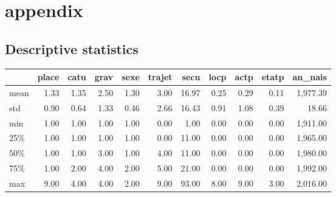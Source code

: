 \documentclass[a4paper]{article}
\theoremstyle{definition}
\theoremstyle{proposition}
\begin{document}
\section{appendix}

\subsection{Descriptive statistics} \label{Descriptive statistics}
\begin{tabular}{lrrrrrrrrrr}
\toprule
{} &      place &       catu &       grav &       sexe &     trajet &       secu &       locp &       actp &      etatp &    an\_nais \\
\midrule
mean  &       1.33 &       1.35 &       2.50 &       1.30 &       3.00 &      16.97 &       0.25 &       0.29 &       0.11 &   1,977.39 \\
std   &       0.90 &       0.64 &       1.33 &       0.46 &       2.66 &      16.43 &       0.91 &       1.08 &       0.39 &      18.66 \\
min   &       1.00 &       1.00 &       1.00 &       1.00 &       0.00 &       1.00 &       0.00 &       0.00 &       0.00 &   1,911.00 \\
25\%   &       1.00 &       1.00 &       1.00 &       1.00 &       0.00 &      11.00 &       0.00 &       0.00 &       0.00 &   1,965.00 \\
50\%   &       1.00 &       1.00 &       3.00 &       1.00 &       4.00 &      11.00 &       0.00 &       0.00 &       0.00 &   1,980.00 \\
75\%   &       1.00 &       2.00 &       4.00 &       2.00 &       5.00 &      21.00 &       0.00 &       0.00 &       0.00 &   1,992.00 \\
max   &       9.00 &       4.00 &       4.00 &       2.00 &       9.00 &      93.00 &       8.00 &       9.00 &       3.00 &   2,016.00 \\
\bottomrule
\end{tabular}

\vspace{0.5cm}
\end{document}
